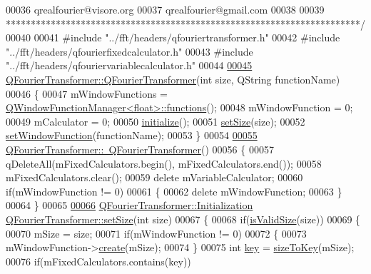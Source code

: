 \begin{DoxyCode}
00036 \textcolor{comment}{qrealfourier@visore.org}
00037 \textcolor{comment}{qrealfourier@gmail.com}
00038 \textcolor{comment}{}
00039 \textcolor{comment}{***********************************************************************/}
00040 
00041 \textcolor{preprocessor}{#include "../fft/headers/qfouriertransformer.h"}
00042 \textcolor{preprocessor}{#include "../fft/headers/qfourierfixedcalculator.h"}
00043 \textcolor{preprocessor}{#include "../fft/headers/qfouriervariablecalculator.h"}
00044 
\hypertarget{a00121_source_l00045}{}\hyperlink{a00054_a87498c4b95128ec0052d31a87e97a9b9}{00045} \hyperlink{a00054_a87498c4b95128ec0052d31a87e97a9b9}{QFourierTransformer::QFourierTransformer}(\textcolor{keywordtype}{int} size, QString 
      functionName)
00046 \{
00047     mWindowFunctions = \hyperlink{a00072_ae0508780c15f6c28fb566dfe76c9a082}{QWindowFunctionManager<float>::functions}();
00048     mWindowFunction = 0;
00049     mCalculator = 0;
00050     \hyperlink{a00054_a050f813673ba678aefeeafba415c82aa}{initialize}();
00051     \hyperlink{a00054_aab762683a5ed505ed7be906c4340cb07}{setSize}(size);
00052     \hyperlink{a00054_a8c8f0a2101aba7f6da70050c7ebdc36c}{setWindowFunction}(functionName);
00053 \}
00054 
\hypertarget{a00121_source_l00055}{}\hyperlink{a00054_a04c4f72887461f5951332b9cac7bef13}{00055} \hyperlink{a00054_a04c4f72887461f5951332b9cac7bef13}{QFourierTransformer::~QFourierTransformer}()
00056 \{
00057     qDeleteAll(mFixedCalculators.begin(), mFixedCalculators.end());
00058     mFixedCalculators.clear();
00059     \textcolor{keyword}{delete} mVariableCalculator;
00060     \textcolor{keywordflow}{if}(mWindowFunction != 0)
00061     \{
00062         \textcolor{keyword}{delete} mWindowFunction;
00063     \}
00064 \}
00065 
\hypertarget{a00121_source_l00066}{}\hyperlink{a00054_aab762683a5ed505ed7be906c4340cb07}{00066} \hyperlink{a00054_aeb481656565bc92ec7b2f3e9d5d883c3}{QFourierTransformer::Initialization} 
      \hyperlink{a00054_aab762683a5ed505ed7be906c4340cb07}{QFourierTransformer::setSize}(\textcolor{keywordtype}{int} size)
00067 \{
00068     \textcolor{keywordflow}{if}(\hyperlink{a00054_ac6ce59f26c2e51bc91f16ba42cf059a4}{isValidSize}(size))
00069     \{
00070         mSize = size;
00071         \textcolor{keywordflow}{if}(mWindowFunction != 0)
00072         \{
00073             mWindowFunction->\hyperlink{a00071_a23ec85a35c762367195a47898cc75380}{create}(mSize);
00074         \}
00075         \textcolor{keywordtype}{int} \hyperlink{a00116_a94bb892c30911cd62cba0707a5395be4}{key} = \hyperlink{a00054_ae8918e95cfd4b0b65bae0947903918ac}{sizeToKey}(mSize);
00076         \textcolor{keywordflow}{if}(mFixedCalculators.contains(key))

\end{DoxyCode}
